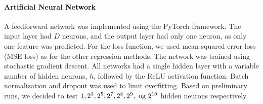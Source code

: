 \paragraph{Artificial Neural Network}
A feedforward network was implemented using the PyTorch framework.
The input layer had $ D $ neurons, and the output layer had only one neuron, as only one feature was predicted.
For the loss function, we used mean squared error loss (MSE loss) as for the other regression methods.
The network was trained using stochastic gradient descent.
All networks had a single hidden layer with a variable number of hidden neurons, $ h $, followed by the ReLU activation function.
Batch normalization and dropout was used to limit overfitting.
Based on preliminary runs, we decided to test $ 1, 2^3, 2^5, 2^7, 2^8, 2^9,\textup{ og } 2^{10} $ hidden neurons respectively.

